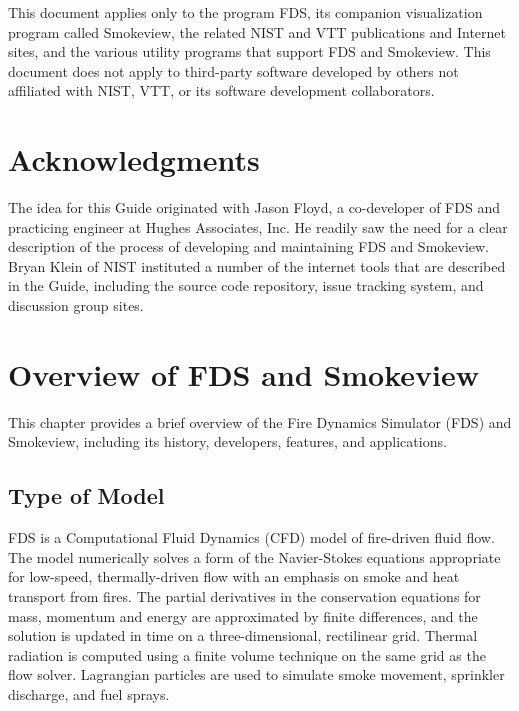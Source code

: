 \documentclass[11pt]{book}
\begin{document}
This document applies only to the program FDS, its companion visualization program called Smokeview,  the related NIST and VTT publications and Internet
sites, and the various utility programs that support FDS and Smokeview. This document does not apply to third-party software developed by others
not affiliated with NIST, VTT, or its software development collaborators.



\chapter{Acknowledgments}

\label{acksection}

The idea for this Guide originated with Jason Floyd, a co-developer of FDS and practicing engineer at Hughes Associates, Inc. He readily saw the need
for a clear description of the process of developing and maintaining FDS and Smokeview. Bryan Klein of NIST instituted a number of the internet tools that
are described in the Guide, including the source code repository, issue tracking system, and discussion group sites.




\tableofcontents

\mainmatter


\chapter{Overview of FDS and Smokeview}

This chapter provides a brief overview of the Fire Dynamics Simulator (FDS) and Smokeview, including its history, developers, features, and applications.


\section{Type of Model}

FDS is a Computational Fluid Dynamics (CFD) model of fire-driven fluid flow. The model numerically solves a form of the Navier-Stokes equations
appropriate for low-speed, thermally-driven flow with an emphasis on smoke and heat transport from fires. The partial derivatives in the conservation
equations for mass, momentum and energy are approximated by finite differences, and the solution is updated in time on a three-dimensional,
rectilinear grid. Thermal radiation is computed using a finite volume technique on the same grid as the flow solver. Lagrangian particles are used to
simulate smoke movement, sprinkler discharge, and fuel sprays.
\end{document}
